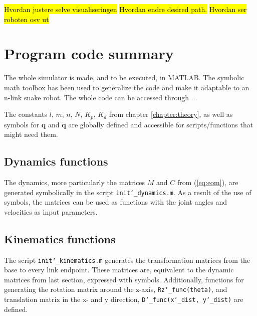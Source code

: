 \hl{Hvordan justere selve visualiseringen}
\hl{Hvordan endre desired path.}
\hl{Hvordan ser roboten osv ut}

\section{Program code summary}

The whole simulator is made, and to be executed, in MATLAB. The symbolic math toolbox has been used to generalize the code and make it adaptable to an n-link snake robot. The whole code can be accessed through ...

The constants $l$, $m$, $n$, $N$, $K_p$, $K_d$ from chapter \ref{chapter:theory}, as well as symbols for $\mathbf{q}$ and $\mathbf{\dot{q}}$ are globally defined and accessible for scripts/functions that might need them.

\subsection{Dynamics functions}

The dynamics, more particularly the matrices $M$ and $C$ from (\ref{eq:eom}), are generated symbolically in the script \texttt{init\char`_dynamics.m}.
As a result of the use of symbols, the matrices can be used as functions with the joint angles and velocities as input parameters.


\subsection{Kinematics functions}\label{subseq:kinfunc}

The script \texttt{init\char`_kinematics.m} generates the transformation matrices from the base to every link endpoint. These matrices are, equivalent to the dynamic matrices from last section, expressed with symbols. Additionally, functions for generating the rotation matrix around the z-axis, \texttt{Rz\char`_func(theta)}, and translation matrix in the x- and y direction, \texttt{D\char`_func(x\char`_dist, y\char`_dist)} are defined.


